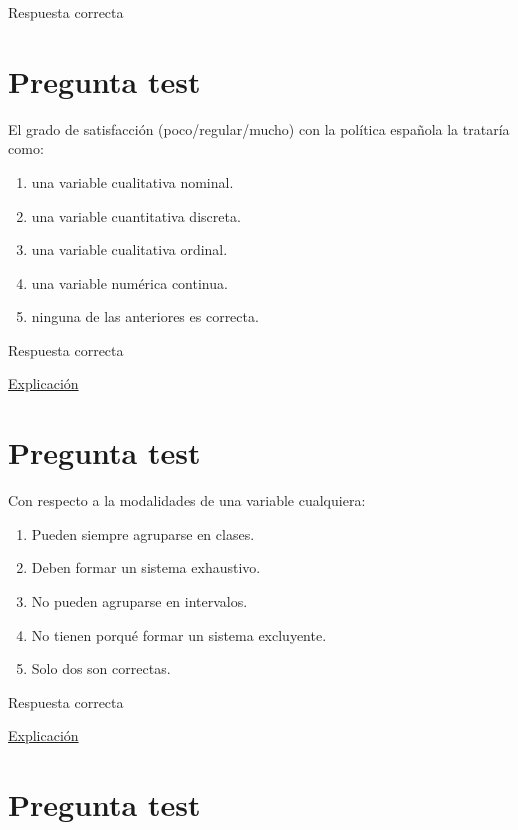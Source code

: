 \documentclass[
]{book}
\providecommand{\tightlist}{%
  \setlength{\itemsep}{0pt}\setlength{\parskip}{0pt}}
\begin{document}
Respuesta correcta

\hypertarget{pregunta-test-28}{%
\section{Pregunta test}\label{pregunta-test-28}}

El grado de satisfacción (poco/regular/mucho) con la política española la trataría como:

\begin{enumerate}
\def\labelenumi{\alph{enumi})}
\tightlist
\item
  una variable cualitativa nominal.
\item
  una variable cuantitativa discreta.
\item
  una variable cualitativa ordinal.
\item
  una variable numérica continua.
\item
  ninguna de las anteriores es correcta.
\end{enumerate}

Respuesta correcta

\href{https://1fjmanzano.github.io/bioestadistica/tipos-de-variables.html}{Explicación}

\hypertarget{pregunta-test-29}{%
\section{Pregunta test}\label{pregunta-test-29}}

Con respecto a la modalidades de una variable cualquiera:

\begin{enumerate}
\def\labelenumi{\alph{enumi})}
\tightlist
\item
  Pueden siempre agruparse en clases.
\item
  Deben formar un sistema exhaustivo.
\item
  No pueden agruparse en intervalos.
\item
  No tienen porqué formar un sistema excluyente.
\item
  Solo dos son correctas.
\end{enumerate}

Respuesta correcta

\href{https://1fjmanzano.github.io/bioestadistica/tipos-de-variables.html}{Explicación}

\hypertarget{pregunta-test-30}{%
\section{Pregunta test}\label{pregunta-test-30}}
\end{document}
